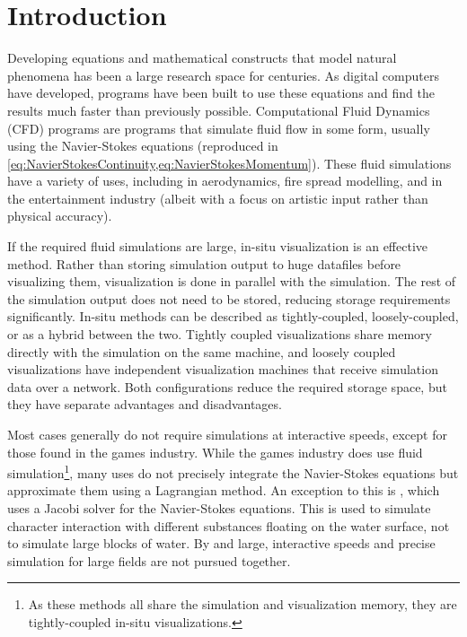 
\chapter{Introduction}
\label{sec:Introduction} 
Developing equations and mathematical constructs that model natural phenomena has been a large research space for centuries.
As digital computers have developed, programs have been built to use these equations and find the results much faster than previously possible\cite{AtomicHeritageFoundationComputingProject}.
Computational Fluid Dynamics (CFD) programs are programs that simulate fluid flow in some form, usually using the Navier-Stokes equations (reproduced in \cref{eq:NavierStokesContinuity,eq:NavierStokesMomentum}).
These fluid simulations have a variety of uses,
including in aerodynamics\cite{jameson2002},
fire spread modelling\cite{Sullivan_2009},
and in the entertainment industry (albeit with a focus on artistic input rather than physical accuracy\cite{article:FluidDynamicsOnBigScreen}).

If the required fluid simulations are large, in-situ visualization is an effective method.
Rather than storing simulation output to huge datafiles before visualizing them, visualization is done in parallel with the simulation\cite{kress2017situ}.
The rest of the simulation output does not need to be stored, reducing storage requirements significantly.
In-situ methods can be described as tightly-coupled, loosely-coupled, or as a hybrid between the two.
Tightly coupled visualizations share memory directly with the simulation on the same machine, and loosely coupled visualizations have independent visualization machines that receive simulation data over a network.
Both configurations reduce the required storage space, but they have separate advantages and disadvantages.

Most cases generally do not require simulations at interactive speeds, except for those found in the games industry.
While the games industry does use fluid simulation\cite{paper:GameFluidSummary:medveckyreal}\footnote{As these methods all share the simulation and visualization memory, they are tightly-coupled in-situ visualizations.}, many uses do not precisely integrate the Navier-Stokes equations but approximate them using a Lagrangian method\cite{paper:StableFluids:10.1145/311535.311548}.
An exception to this is \cite{presentation:RealtimeFluidSimTombRaider}, which uses a Jacobi solver for the Navier-Stokes equations. This is used to simulate character interaction with different substances floating on the water surface\cite{presentation:RealtimeFluidSimTombRaider}, not to simulate large blocks of water.
By and large, interactive speeds and precise simulation for large fields are not pursued together.


